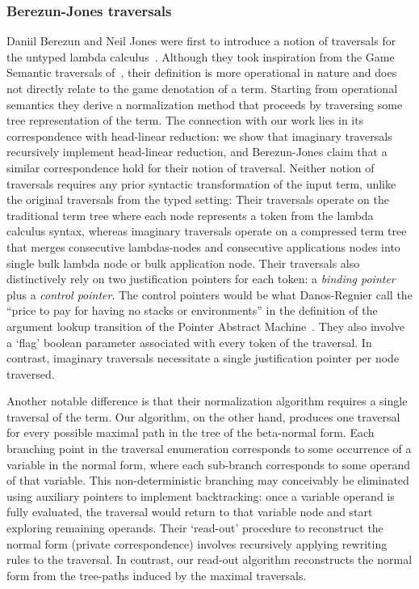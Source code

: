 \documentclass{elsarticle}
\theoremstyle{plain}
\theoremstyle{definition}
\begin{document}
\subsubsection{Berezun-Jones traversals}

Daniil Berezun and Neil Jones were first to introduce a notion of traversals for the untyped lambda calculus~\cite{JonesBerezunLLL-PEPM17}.
Although they took inspiration from the Game Semantic traversals of~\cite{OngLics2006,BlumGalop2008}, their definition is more operational in nature and does not directly relate to the game denotation of a term. Starting from operational semantics they derive a normalization method that proceeds by traversing some tree representation of the term.
%
The connection with our work lies in its correspondence with head-linear reduction: we show that imaginary traversals recursively implement head-linear reduction, and Berezun-Jones claim that a similar correspondence hold for their notion of traversal.
%
Neither notion of traversals requires any prior syntactic transformation of the input term, unlike the original traversals from the typed setting:
Their traversals operate on the traditional term tree where each node represents a token from the lambda calculus syntax,
whereas imaginary traversals operate on a compressed term tree that merges consecutive lambdas-nodes and consecutive applications nodes into single bulk lambda node or bulk application node.
%
Their traversals also distinctively rely on two justification pointers for each token: a \emph{binding pointer} plus a \emph{control pointer}. The control pointers would be what Danos-Regnier call the ``price to pay for having no stacks or environments'' in the definition of the argument lookup transition of the Pointer Abstract Machine~\cite{danos-head}. They also involve a `flag' boolean parameter associated with every token of the traversal.
In contrast, imaginary traversals necessitate a single justification pointer per node traversed.

Another notable difference is that their normalization algorithm requires a single traversal of the term. Our algorithm, on the other hand, produces one traversal for every possible maximal path in the tree of the beta-normal form. Each branching point in the traversal enumeration corresponds to some occurrence of a variable in the normal form, where each sub-branch corresponds to some operand of that variable. This non-deterministic branching may conceivably be eliminated using auxiliary pointers to implement backtracking: once a variable operand is fully evaluated, the traversal would return to that variable node and start exploring remaining operands.
%
Their `read-out' procedure to reconstruct the normal form (private correspondence) involves recursively applying rewriting rules to the traversal. In contrast, our read-out algorithm reconstructs the normal form from the tree-paths induced by the maximal traversals.
\end{document}
